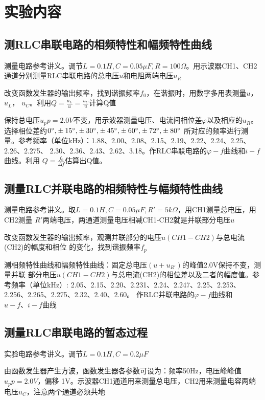 \documentclass[11pt,a4paper]{article}
\begin{document}
\section{实验内容}
    \subsection{测RLC串联电路的相频特性和幅频特性曲线}
    测量电路参考讲义。调节$L=0.1H,C=0.05\mu F,R=100\Omega$。用示波器CH1、CH2通道分别测量RLC串联电路的总电压$u$和电阻两端电压$u_R$

    改变函数发生器的输出频率，找到谐振频率$f_0$，在谐振时，用数字多用表测量$u$，$u_L$，
    $u_C$。利用$Q=\frac{u_L}{u}=\frac{u_C}{u}$计算Q值

    保持总电压$u_pp=2.0V$不变，用示波器测量电压、电流间相位差$\varphi$以及相应的$u_R$。
    选择相位差约$0^\circ {\rm{,}} \pm 15^\circ {\rm{,}} \pm 30^\circ {\rm{,}} \pm 45^\circ {\rm{,}} \pm 60^\circ {\rm{,}} \pm 72^\circ {\rm{,}} \pm 80^\circ $
    所对应的频率进行测量。参考频率（单位kHz）：1.88、2.00、2.08、2.15、2.19、2.22、2.24、2.25、2.26、2.275、
    2.30、2.36、2.43、2.62、3.18。作RLC串联电路的$\varphi-f$曲线和$i-f$曲线。利用
    $Q=\frac{f_0}{\Delta f}$估算出Q值。

    \subsection{测量RLC并联电路的相频特性与幅频特性曲线}
    测量电路参考讲义。取$L=0.1H,C=0.05\mu F,R'=5k\Omega$，用CH1测量总电压，用CH2测量
    $R'$两端电压，两通道测量电压相减CH1-CH2就是并联部分电压$u$

    改变函数发生器的输出频率，观测并联部分的电压$u(CH1-CH2)$与总电流(CH2)的幅度和相位
    的变化，找到谐振频率$f_p$

    测相频特性曲线和幅频特性曲线：固定总电压$(u+u_{R'})$的峰值2.0V保持不变，测量并联
    部分电压$u(CH1-CH2)$与总电流(CH2)的相位差以及二者的幅度值。参考频率（单位kHz）:
    2.05、2.15、2.20、2.231、2.24、2.247、2.25、2.253、2.256、2.265、2.275、2.32、2.40、2.60。
    作RLC并联电路的$\varphi-f$曲线和$u-f、i-f$曲线

    \subsection{测量RLC串联电路的暂态过程}
    实验电路参考讲义。调节$L=0.1H,C=0.2\mu F$

    由函数发生器产生方波，函数发生器各参数可设为：频率50Hz，电压峰峰值$u_pp=2.0V$，偏移
    1V。示波器CH1通道用来测量总电压，CH2用来测量电容两端电压$u_C$，注意两个通道必须共地
\end{document}
